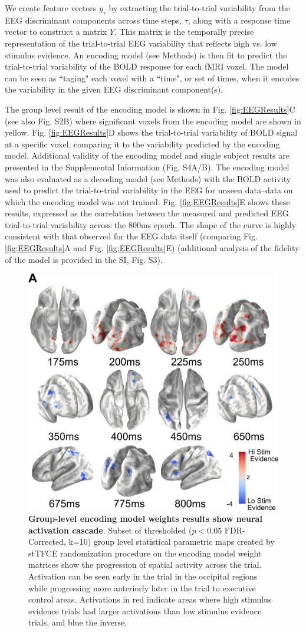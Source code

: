 We create feature vectors $y_{\tau}$ by extracting the trial-to-trial variability from the EEG discriminant components across time steps, $\tau$, along with a response time vector to construct a matrix $Y$.  This matrix is the temporally precise representation of the trial-to-trial EEG variability that reflects high vs. low stimulus evidence. An encoding model (see Methods) is then fit to predict the trial-to-trial variability of the BOLD response for each fMRI voxel. The model can be seen as  ``taging" each voxel with a ``time", or set of times, when it encodes the variability in the given EEG discriminant component(s).

The group level result of the encoding model is shown in Fig. \ref{fig:EEGResults}C (see also Fig. S2B) where significant voxels from the encoding model are shown in yellow. Fig. \ref{fig:EEGResults}D shows the trial-to-trial variability of BOLD signal at a specific voxel, comparing it to the variability predicted by the encoding model. Additional validity of the encoding model and single subject results are presented in the Supplemental Information (Fig. S4A/B). The encoding model was also evaluated as a decoding model (see Methods) with the BOLD activity used to predict the trial-to-trial variability in the EEG for unseen data--data on which the encoding model was not trained. Fig. \ref{fig:EEGResults}E shows these results, expressed as the correlation between the measured and predicted EEG trial-to-trial variability across the 800ms epoch. The shape of the curve is highly consistent with that observed for the EEG data itself (comparing Fig. \ref{fig:EEGResults}A and Fig. \ref{fig:EEGResults}E) (additional analysis of the fidelity of the model is provided in the SI, Fig. S3).


\begin{figure}[htb!]
\centering
\includegraphics[width=.5\textwidth]{Fig5.png}
\caption{\textbf{Group-level encoding model weights results show neural activation cascade}. Subset of thresholded ($p< 0.05$ FDR-Corrected, k=10) group level statistical parametric maps created by stTFCE randomization procedure on the encoding model weight matrices show the progression of spatial activity across the trial. Activation can be seen early in the trial in the occipital regions while progressing more anteriorly later in the trial to executive control areas. Activations in red indicate areas where high stimulus evidence trials had larger activations than low stimulus evidence trials, and blue the inverse.}
\label{fig:fMRIResults}
\end{figure}

